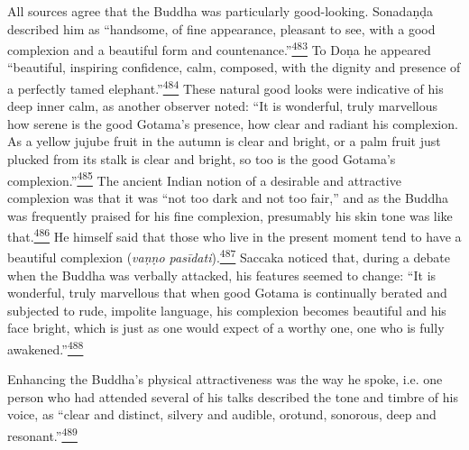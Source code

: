 All sources agree that the Buddha was particularly good-looking.
Sonadaṇḍa described him as ``handsome, of fine appearance, pleasant to
see, with a good complexion and a beautiful form and
countenance.''\label{footprints_split_013.html_fnref483}\hyperref[footprints_split_025.htmlux5cux23fn483]{\textsuperscript{483}}
To Doṇa he appeared ``beautiful, inspiring confidence, calm, composed,
with the dignity and presence of a perfectly tamed
elephant.''\label{footprints_split_013.html_fnref484}\hyperref[footprints_split_025.htmlux5cux23fn484]{\textsuperscript{484}}
These natural good looks were indicative of his deep inner calm, as
another observer noted: ``It is wonderful, truly marvellous how serene
is the good Gotama's presence, how clear and radiant his complexion. As
a yellow jujube fruit in the autumn is clear and bright, or a palm fruit
just plucked from its stalk is clear and bright, so too is the good
Gotama's
complexion.''\label{footprints_split_013.html_fnref485}\hyperref[footprints_split_025.htmlux5cux23fn485]{\textsuperscript{485}}
The ancient Indian notion of a desirable and attractive complexion was
that it was ``not too dark and not too fair,'' and as the Buddha was
frequently praised for his fine complexion, presumably his skin tone was
like
that.\label{footprints_split_013.html_fnref486}\hyperref[footprints_split_025.htmlux5cux23fn486]{\textsuperscript{486}}
He himself said that those who live in the present moment tend to have a
beautiful complexion (\emph{vaṇṇo
pasīdati}).\label{footprints_split_013.html_fnref487}\hyperref[footprints_split_025.htmlux5cux23fn487]{\textsuperscript{487}}
Saccaka noticed that, during a debate when the Buddha was verbally
attacked, his features seemed to change: ``It is wonderful, truly
marvellous that when good Gotama is continually berated and subjected to
rude, impolite language, his complexion becomes beautiful and his face
bright, which is just as one would expect of a worthy one, one who is
fully
awakened.''\label{footprints_split_013.html_fnref488}\hyperref[footprints_split_025.htmlux5cux23fn488]{\textsuperscript{488}}

Enhancing the Buddha's physical attractiveness was the way he spoke,
i.e. one person who had attended several of his talks described the tone
and timbre of his voice, as ``clear and distinct, silvery and audible,
orotund, sonorous, deep and
resonant.''\label{footprints_split_013.html_fnref489}\hyperref[footprints_split_025.htmlux5cux23fn489]{\textsuperscript{489}}

